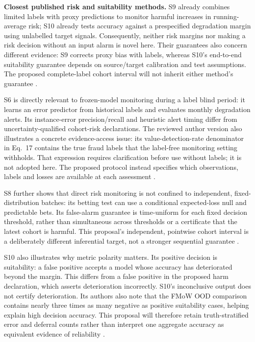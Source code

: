 \documentclass[11pt,a4paper]{article}
\begin{document}
\textbf{Closest published risk and suitability methods.} S9 already combines
limited labels with proxy predictions to monitor harmful increases in
running-average risk; S10 already tests accuracy against a prespecified
degradation margin using unlabelled target signals. Consequently, neither
risk margins nor making a risk decision without an input alarm is novel here.
Their guarantees also concern different evidence: S9 corrects proxy bias with
labels, whereas S10's end-to-end suitability guarantee depends on source/target
calibration and test assumptions. The proposed complete-label cohort interval
will not inherit either method's guarantee \cite{pprm,suitability}.

S6 is directly relevant to frozen-model monitoring during a label blind
period: it learns an error predictor from historical labels and evaluates
monthly degradation alerts. Its instance-error precision/recall and heuristic
alert timing differ from uncertainty-qualified cohort-risk declarations.
The reviewed author version also illustrates a concrete evidence-access issue:
its value-detection-rate denominator in Eq.~17 contains the true fraud labels
that the label-free monitoring setting withholds. That expression requires
clarification before use without labels; it is not adopted here.
The proposed protocol instead specifies which observations, labels and
losses are available at each assessment \cite{prodem}.

S8 further shows that direct risk monitoring is not confined to independent,
fixed-distribution batches: its betting test can use a conditional expected-loss
null and predictable bets. Its false-alarm guarantee is time-uniform for each
fixed decision threshold, rather than simultaneous across thresholds or a
certificate that the latest cohort is harmful. This proposal's independent,
pointwise cohort interval is a deliberately different inferential target,
not a stronger sequential guarantee \cite{timans}.

S10 also illustrates why metric polarity matters. Its positive decision is
suitability: a false positive accepts a model whose accuracy has deteriorated
beyond the margin. This differs from a false positive in the proposed harm
declaration, which asserts deterioration incorrectly. S10's inconclusive output
does not certify deterioration. Its authors also note that the FMoW OOD
comparison contains nearly three times as many negative as positive
suitability cases, helping explain high decision accuracy. This proposal will
therefore retain truth-stratified error and deferral counts rather than
interpret one aggregate accuracy as equivalent evidence of reliability
\cite{suitability}.
\end{document}
